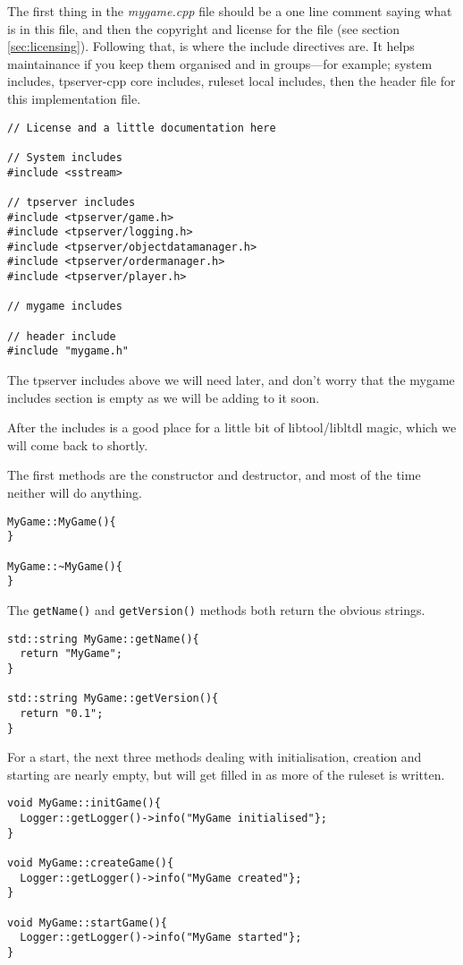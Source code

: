 \documentclass[a4paper,11pt]{report}
\newcommand{\filename}[1]{\emph{#1}}
\newcommand{\codename}[1]{\texttt{#1}}
\begin{document}
The first thing in the \filename{mygame.cpp} file should be a one line comment saying what is in this file, and then the copyright and license for the file (see section \ref{sec:licensing}). Following that, is where the include directives are. It helps maintainance if you keep them organised and in groups---for example; system includes, tpserver-cpp core includes, ruleset local includes, then the header file for this implementation file.

\begin{verbatim}
// License and a little documentation here

// System includes
#include <sstream>

// tpserver includes
#include <tpserver/game.h>
#include <tpserver/logging.h>
#include <tpserver/objectdatamanager.h>
#include <tpserver/ordermanager.h>
#include <tpserver/player.h>

// mygame includes

// header include
#include "mygame.h"
\end{verbatim}

The tpserver includes above we will need later, and don't worry that the mygame includes section is empty as we will be adding to it soon.

After the includes is a good place for a little bit of libtool/libltdl magic, which we will come back to shortly.

The first methods are the constructor and destructor, and most of the time neither will do anything.

\begin{verbatim}
MyGame::MyGame(){
}

MyGame::~MyGame(){
}
\end{verbatim}

The \codename{getName()} and \codename{getVersion()} methods both return the obvious strings.

\begin{verbatim}
std::string MyGame::getName(){
  return "MyGame";
}

std::string MyGame::getVersion(){
  return "0.1";
}
\end{verbatim}

For a start, the next three methods dealing with initialisation, creation and starting are nearly empty, but will get filled in as more of the ruleset is written.

\begin{verbatim}
void MyGame::initGame(){
  Logger::getLogger()->info("MyGame initialised"};
}

void MyGame::createGame(){
  Logger::getLogger()->info("MyGame created"};
}

void MyGame::startGame(){
  Logger::getLogger()->info("MyGame started"};
}
\end{verbatim}
\end{document}
